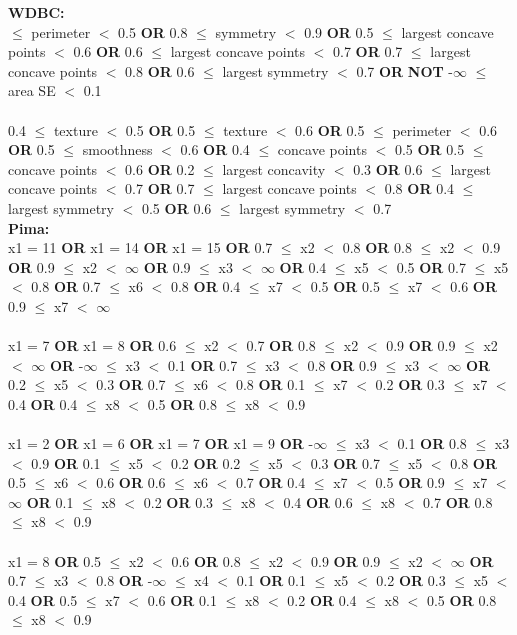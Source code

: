 \noindent \textbf{ WDBC: }\\

 $\le$ perimeter $<$ 0.5 \textbf{OR} 0.8 $\le$ symmetry $<$ 0.9 \textbf{OR} 0.5 $\le$ largest concave points $<$ 0.6 \textbf{OR} 0.6 $\le$ largest concave points $<$ 0.7 \textbf{OR} 0.7 $\le$ largest concave points $<$ 0.8 \textbf{OR} 0.6 $\le$ largest symmetry $<$ 0.7 \textbf{OR}  \textbf{NOT} -$\infty$ $\le$ area SE $<$ 0.1 \\\\0.4 $\le$ texture $<$ 0.5 \textbf{OR} 0.5 $\le$ texture $<$ 0.6 \textbf{OR} 0.5 $\le$ perimeter $<$ 0.6 \textbf{OR} 0.5 $\le$ smoothness $<$ 0.6 \textbf{OR} 0.4 $\le$ concave points $<$ 0.5 \textbf{OR} 0.5 $\le$ concave points $<$ 0.6 \textbf{OR} 0.2 $\le$ largest concavity $<$ 0.3 \textbf{OR} 0.6 $\le$ largest concave points $<$ 0.7 \textbf{OR} 0.7 $\le$ largest concave points $<$ 0.8 \textbf{OR} 0.4 $\le$ largest symmetry $<$ 0.5 \textbf{OR} 0.6 $\le$ largest symmetry $<$ 0.7 \\

\noindent \textbf{ Pima: }\\

\noindent x1 = 11 \textbf{OR} x1 = 14 \textbf{OR} x1 = 15 \textbf{OR} 0.7 $\le$ x2 $<$ 0.8 \textbf{OR} 0.8 $\le$ x2 $<$ 0.9 \textbf{OR} 0.9 $\le$ x2 $<$ $\infty$ \textbf{OR} 0.9 $\le$ x3 $<$ $\infty$ \textbf{OR} 0.4 $\le$ x5 $<$ 0.5 \textbf{OR} 0.7 $\le$ x5 $<$ 0.8 \textbf{OR} 0.7 $\le$ x6 $<$ 0.8 \textbf{OR} 0.4 $\le$ x7 $<$ 0.5 \textbf{OR} 0.5 $\le$ x7 $<$ 0.6 \textbf{OR} 0.9 $\le$ x7 $<$ $\infty$ \\\\x1 = 7 \textbf{OR} x1 = 8 \textbf{OR} 0.6 $\le$ x2 $<$ 0.7 \textbf{OR} 0.8 $\le$ x2 $<$ 0.9 \textbf{OR} 0.9 $\le$ x2 $<$ $\infty$ \textbf{OR} -$\infty$ $\le$ x3 $<$ 0.1 \textbf{OR} 0.7 $\le$ x3 $<$ 0.8 \textbf{OR} 0.9 $\le$ x3 $<$ $\infty$ \textbf{OR} 0.2 $\le$ x5 $<$ 0.3 \textbf{OR} 0.7 $\le$ x6 $<$ 0.8 \textbf{OR} 0.1 $\le$ x7 $<$ 0.2 \textbf{OR} 0.3 $\le$ x7 $<$ 0.4 \textbf{OR} 0.4 $\le$ x8 $<$ 0.5 \textbf{OR} 0.8 $\le$ x8 $<$ 0.9 \\\\x1 = 2 \textbf{OR} x1 = 6 \textbf{OR} x1 = 7 \textbf{OR} x1 = 9 \textbf{OR} -$\infty$ $\le$ x3 $<$ 0.1 \textbf{OR} 0.8 $\le$ x3 $<$ 0.9 \textbf{OR} 0.1 $\le$ x5 $<$ 0.2 \textbf{OR} 0.2 $\le$ x5 $<$ 0.3 \textbf{OR} 0.7 $\le$ x5 $<$ 0.8 \textbf{OR} 0.5 $\le$ x6 $<$ 0.6 \textbf{OR} 0.6 $\le$ x6 $<$ 0.7 \textbf{OR} 0.4 $\le$ x7 $<$ 0.5 \textbf{OR} 0.9 $\le$ x7 $<$ $\infty$ \textbf{OR} 0.1 $\le$ x8 $<$ 0.2 \textbf{OR} 0.3 $\le$ x8 $<$ 0.4 \textbf{OR} 0.6 $\le$ x8 $<$ 0.7 \textbf{OR} 0.8 $\le$ x8 $<$ 0.9 \\\\x1 = 8 \textbf{OR} 0.5 $\le$ x2 $<$ 0.6 \textbf{OR} 0.8 $\le$ x2 $<$ 0.9 \textbf{OR} 0.9 $\le$ x2 $<$ $\infty$ \textbf{OR} 0.7 $\le$ x3 $<$ 0.8 \textbf{OR} -$\infty$ $\le$ x4 $<$ 0.1 \textbf{OR} 0.1 $\le$ x5 $<$ 0.2 \textbf{OR} 0.3 $\le$ x5 $<$ 0.4 \textbf{OR} 0.5 $\le$ x7 $<$ 0.6 \textbf{OR} 0.1 $\le$ x8 $<$ 0.2 \textbf{OR} 0.4 $\le$ x8 $<$ 0.5 \textbf{OR} 0.8 $\le$ x8 $<$ 0.9 \\

